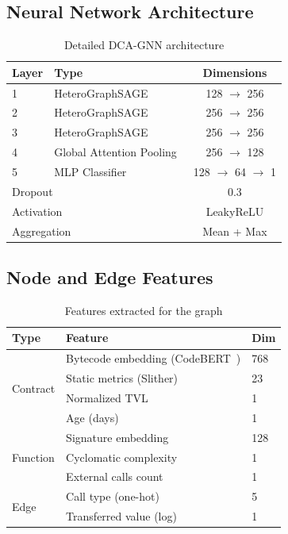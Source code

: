 \documentclass[11pt]{article}
\theoremstyle{definition}
\theoremstyle{plain}
\theoremstyle{remark}
\begin{document}
\subsection{Neural Network Architecture}

\begin{table}[H]
\centering
\caption{Detailed DCA-GNN architecture}
\label{tab:gnn_architecture}
\begin{tabular}{llc}
\toprule
\textbf{Layer} & \textbf{Type} & \textbf{Dimensions} \\
\midrule
1 & HeteroGraphSAGE~\cite{hamilton2017inductive} & 128 $\rightarrow$ 256 \\
2 & HeteroGraphSAGE & 256 $\rightarrow$ 256 \\
3 & HeteroGraphSAGE & 256 $\rightarrow$ 256 \\
4 & Global Attention Pooling~\cite{li2016gated} & 256 $\rightarrow$ 128 \\
5 & MLP Classifier & 128 $\rightarrow$ 64 $\rightarrow$ 1 \\
\midrule
\multicolumn{2}{l}{Dropout} & 0.3 \\
\multicolumn{2}{l}{Activation} & LeakyReLU \\
\multicolumn{2}{l}{Aggregation} & Mean + Max \\
\bottomrule
\end{tabular}
\end{table}

\subsection{Node and Edge Features}

\begin{table}[H]
\centering
\caption{Features extracted for the graph}
\label{tab:gnn_features}
\begin{tabular}{lll}
\toprule
\textbf{Type} & \textbf{Feature} & \textbf{Dim} \\
\midrule
\multirow{4}{*}{Contract} & Bytecode embedding (CodeBERT~\cite{feng2020codebert}) & 768 \\
 & Static metrics (Slither) & 23 \\
 & Normalized TVL & 1 \\
 & Age (days) & 1 \\
\midrule
\multirow{3}{*}{Function} & Signature embedding & 128 \\
 & Cyclomatic complexity & 1 \\
 & External calls count & 1 \\
\midrule
\multirow{2}{*}{Edge} & Call type (one-hot) & 5 \\
 & Transferred value (log) & 1 \\
\bottomrule
\end{tabular}
\end{table}
\end{document}
